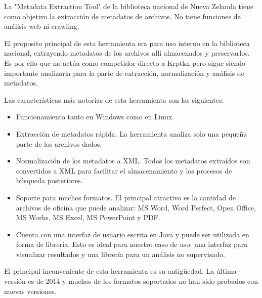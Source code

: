 La "Metadata Extraction Tool" de la biblioteca nacional de Nueva Zelanda tiene como objetivo la extracción de metadatos de archivos. No tiene funciones de análisis web ni crawling.

El proposito principal de esta herramienta era para uso interno en la biblioteca nacional, extrayendo metadatos de los archivos allí almacenados y preservarlos. Es por ello que no actúa como competidor directo a Krptkn pero sigue siendo importante analizarla para la parte de extracción, normalización y análisis de metadatos.

Las características más notorias de esta herramienta son las siguientes:
\begin{itemize}
  \item Funcionamiento tanto en Windows como en Linux.
  \item Extracción de metadatos rápida. La herramienta analiza solo una pequeña parte de los archivos dados.
  \item Normalización de los metadatos a XML. Todos los metadatos extraídos son convertidos a XML para facilitar el almacenamiento y los procesos de búsqueda posteriores.
  \item Soporte para muchos formatos. El principal atractivo es la cantidad de archivos de oficina que puede analizar: MS Word, Word Perfect, Open Office, MS Works, MS Excel, MS PowerPoint y PDF.
  \item Cuenta con una interfaz de usuario escrita en Java y puede ser utilizada en forma de librería. Esto es ideal para nuestro caso de uso: una interfaz para visualizar resultados y una librería para un análisis no supervisado. 
\end{itemize}

El principal inconveniente de esta herramienta es su antigüedad. La última versión es de 2014 y muchos de los formatos soportados no han sido probados con nuevas versiones.